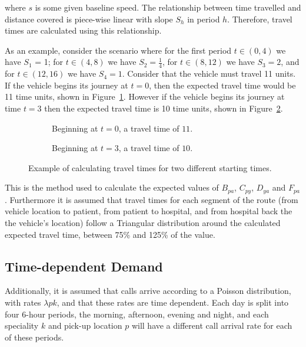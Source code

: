 \documentclass[preprint,12pt]{elsarticle}
\begin{document}
where $s$ is some given baseline speed. The relationship between time travelled
and distance covered is piece-wise linear with slope $S_h$ in period $h$.
Therefore, travel times are calculated using this relationship.

As an example, consider the scenario where for the first period $t \in (0, 4)$
we have $S_1$ = 1; for $t \in (4, 8)$ we have $S_2 = \frac{1}{4}$, for
$t \in (8, 12)$ we have $S_3 = 2$, and for $t \in (12, 16)$ we have $S_4 = 1$.
Consider that the vehicle must travel 11 units. If the vehicle begins its
journey at $t=0$, then the expected travel time would be 11 time units, shown
in Figure~\ref{fig:travel_times_1}. However if the vehicle begins its journey
at time $t=3$ then the expected travel time is 10 time units, shown in
Figure~\ref{fig:travel_times_2}.

\begin{figure}
    \begin{center}
    \begin{subfigure}{6.6cm}
    
    \caption{Beginning at $t=0$, a travel time of $11$.}
    \label{fig:travel_times_1}
    \end{subfigure}
    \begin{subfigure}{6.6cm}
    
    \caption{Beginning at $t=3$, a travel time of $10$.}
    \label{fig:travel_times_2}
    \end{subfigure}
    \end{center}
    \caption{Example of calculating travel times for two different starting
    times.}
    \label{fig:travel_times}
\end{figure}

This is the method used to calculate the expected values of $B_{pa}$, $C_{py}$,
$D_{ya}$ and $F_{pa}$.
Furthermore it is assumed that travel times for each segment of the route
(from vehicle location to patient, from patient to hospital, and from hospital
back the the vehicle's location) follow a Triangular distribution around the
calculated expected travel time, between 75\% and 125\% of the value.


\subsection{Time-dependent Demand}
Additionally, it is assumed that calls arrive according to a Poisson
distribution, with rates $\lambda{pk}$, and that these rates are time
dependent. Each day is split into four 6-hour periods, the morning, afternoon,
evening and night, and each speciality $k$ and pick-up location $p$ will have
a different call arrival rate for each of these periods.
\end{document}

